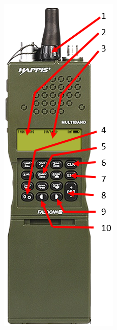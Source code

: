 	\begin{minipage}[t]{0.4\textwidth}
		\includegraphics[width=\textwidth]{./Grafiken/Abschnitt/TFAR_SR_Radio.png}
	\end{minipage}


